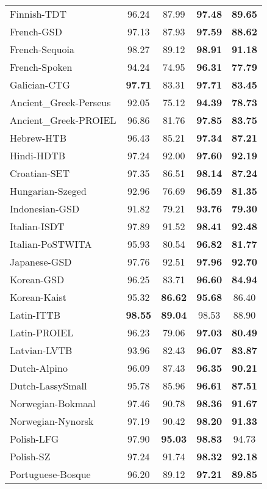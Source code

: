 \begin{longtable}{p{5cm}cccc}
Finnish-TDT & 96.24 & 87.99 & \bf 97.48 & \bf 89.65 \\
French-GSD & 97.13 & 87.93 & \bf 97.59 & \bf 88.62 \\
French-Sequoia & 98.27 & 89.12 & \bf 98.91 & \bf 91.18 \\
French-Spoken & 94.24 & 74.95 & \bf 96.31 & \bf 77.79 \\
Galician-CTG & \bf 97.71 & 83.31 & \bf 97.71 & \bf 83.45 \\
Ancient\_Greek-Perseus & 92.05 & 75.12 & \bf 94.39 & \bf 78.73 \\
Ancient\_Greek-PROIEL & 96.86 & 81.76 & \bf 97.85 & \bf 83.75 \\
Hebrew-HTB & 96.43 & 85.21 & \bf 97.34 & \bf 87.21 \\
Hindi-HDTB & 97.24 & 92.00 & \bf 97.60 & \bf 92.19 \\
Croatian-SET & 97.35 & 86.51 & \bf 98.14 & \bf 87.24 \\
Hungarian-Szeged & 92.96 & 76.69 & \bf 96.59 & \bf 81.35 \\
Indonesian-GSD & 91.82 & 79.21 & \bf 93.76 & \bf 79.30 \\
Italian-ISDT & 97.89 & 91.52 & \bf 98.41 & \bf 92.48 \\
Italian-PoSTWITA & 95.93 & 80.54 & \bf 96.82 & \bf 81.77 \\
Japanese-GSD & 97.76 & 92.51 & \bf 97.96 & \bf 92.70 \\
Korean-GSD & 96.25 & 83.71 & \bf 96.60 & \bf 84.94 \\
Korean-Kaist & 95.32 & \bf 86.62 & \bf 95.68 & 86.40 \\
Latin-ITTB & \bf 98.55 & \bf 89.04 & 98.53 & 88.90 \\
Latin-PROIEL & 96.23 & 79.06 & \bf 97.03 & \bf 80.49 \\
Latvian-LVTB & 93.96 & 82.43 & \bf 96.07 & \bf 83.87 \\
Dutch-Alpino & 96.09 & 87.43 & \bf 96.35 & \bf 90.21 \\
Dutch-LassySmall & 95.78 & 85.96 & \bf 96.61 & \bf 87.51 \\
Norwegian-Bokmaal & 97.46 & 90.78 & \bf 98.36 & \bf 91.67 \\
Norwegian-Nynorsk & 97.19 & 90.42 & \bf 98.20 & \bf 91.33 \\
Polish-LFG & 97.90 & \bf 95.03 & \bf 98.83 & 94.73 \\
Polish-SZ & 97.24 & 91.74 & \bf 98.32 & \bf 92.18 \\
Portuguese-Bosque & 96.20 & 89.12 & \bf 97.21 & \bf 89.85 \\

\end{longtable}
